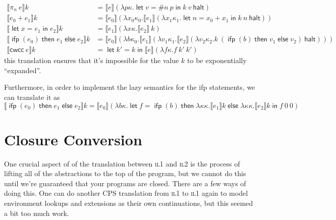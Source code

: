 \documentclass[11pt,a4paper]{article}
\newcommand {\coo} [1] {\ensuremath{\operatorname{\mathsf{#1}}}}
\newcommand {\co} [1] {\coo{#1}}
\newcommand {\Ifp}[3] {\co{ifp} (#1) \co{then} #2 \co{else} #3}
\newcommand{\Let}[1]{\coo{let} #1 \coo{in} }
\newcommand{\f}[1]{\textsc{#1}}
\newcommand{\g}[1]{\textsf{#1}}
\newcommand{\trans}[2]{\ensuremath{\mathcal{#1}\llbracket #2\rrbracket}}
\begin{document}
\begin{enumerate}[label=\textbf{Excercise \arabic*\ }]
\begin{enumerate}
\begin{align*}
\trans{}{\pi_n~e} k &= \trans{}{e} (\lambda p\kappa. \Let{v = \#n~p}{k~v~\g{halt}}) \\
\trans{}{e_0 + e_1} k &= \trans{}{e_0} (\lambda x_0\kappa_0. \trans{}{e_1} (\lambda x_1\kappa_1. \Let{n = x_0 + x_1}{k~n~\g{halt}})) \\
\trans{}{\Let{x = e_1}{e_2}} k &= \trans{}{e_1}(\lambda x\kappa. \trans{}{e_2}~k) \\
\trans{}{\Ifp{e_0}{e_1}{e_2}} k &= \trans{}{e_0}(\lambda b\kappa_0. \trans{}{e_1} (\lambda v_1\kappa_1. \trans{}{e_2} (\lambda v_2\kappa_2. k~(\Ifp{b}{v_1}{v_2})~\g{halt}))) \\
\trans{}{\g{cwcc}~e} k &= \Let{k' = k}{\trans{}{e}(\lambda f\kappa. f~k'~k')}
\end{align*}
this translation ensures that it's impossible for the value $k$ to be exponentially ``expanded''.

Furthermore, in order to implement the lazy semantics for the \g{ifp} statements, we can translate it as
$$
\trans{}{\Ifp{e_0}{e_1}{e_2}} k = \trans{}{e_0} (\lambda b\kappa. \Let{f = \Ifp{b}{\lambda \kappa\kappa. \trans{}{e_1} k}{\lambda \kappa\kappa. \trans{}{e_2} k}}{f~0~0})
$$
\section*{Closure Conversion}
One crucial aspect of of the translation between \f{il1} and \f{il2} is the process of lifting all of the abstractions to the top of the program, but we cannot do this until we're guaranteed that your programs are closed. There are a few ways of doing this. One can do another \f{CPS} translation from \f{il1} to \f{il1} again to model environment lookups and extensions as their own continuations, but this seemed a bit too much work. 


\end{enumerate}
\end{enumerate}
\end{document}
